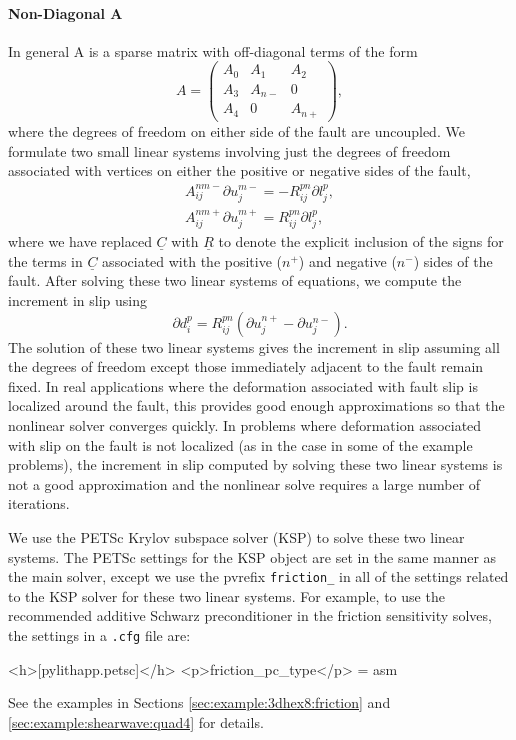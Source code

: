 \paragraph{Non-Diagonal A}

In general A is a sparse matrix with off-diagonal terms of the form
\begin{equation}
A=\left(\begin{array}{ccc}
A_{0} & A_{1} & A_{2}\\
A_{3} & A_{n-} & 0\\
A_{4} & 0 & A_{n+}
\end{array}\right),
\end{equation}
where the degrees of freedom on either side of the fault are uncoupled.
We formulate two small linear systems involving just the degrees of
freedom associated with vertices on either the positive or negative
sides of the fault,
\begin{gather}
A_{ij}^{nm-}\partial u_{j}^{m-}=-R_{ij}^{pn}\partial l_{j}^{p},\\
A_{ij}^{nm+}\partial u_{j}^{m+}=R_{ij}^{pn}\partial l_{j}^{p},
\end{gather}
where we have replaced $\underline{C}$ with $\underline{R}$ to denote
the explicit inclusion of the signs for the terms in $\underline{C}$
associated with the positive ($n^{+}$) and negative ($n^{-}$) sides
of the fault. After solving these two linear systems of equations,
we compute the increment in slip using
\begin{equation}
\partial d_{i}^{p}=R_{ij}^{pn}(\partial u_{j}^{n+}-\partial u_{j}^{n-}).
\end{equation}
The solution of these two linear systems gives the increment in slip
assuming all the degrees of freedom except those immediately adjacent
to the fault remain fixed. In real applications where the deformation
associated with fault slip is localized around the fault, this provides
good enough approximations so that the nonlinear solver converges
quickly. In problems where deformation associated with slip on the
fault is not localized (as in the case in some of the example problems),
the increment in slip computed by solving these two linear systems
is not a good approximation and the nonlinear solve requires a large
number of iterations.

We use the PETSc Krylov subspace solver (KSP) to solve these two linear
systems. The PETSc settings for the KSP object are set in the same
manner as the main solver, except we use the pvrefix \texttt{friction\_}
in all of the settings related to the KSP solver for these two linear
systems. For example, to use the recommended additive Schwarz preconditioner
in the friction sensitivity solves, the settings in a \texttt{.cfg}
file are:
\begin{cfg}
<h>[pylithapp.petsc]</h>
<p>friction_pc_type</p> = asm
\end{cfg}
See the examples in Sections \vref{sec:example:3dhex8:friction}
and \vref{sec:example:shearwave:quad4} for details.


